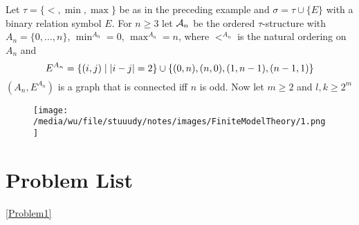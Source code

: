 \documentclass[11pt]{article}
\begin{document}
\begin{examplle}[]
Let \(\tau=\{<,\min,\max\}\) be as in the preceding example and \(\sigma=\tau\cup\{E\}\) with a
binary relation symbol \(E\). For \(n\ge3\) let \(\mathcal{A}_n\) be the ordered \(\tau\)-structure
with \(A_n=\{0,\dots,n\}\), \(\min^{A_n}=0\), \(\max^{A_n}=n\), where \(<^{A_n}\) is the natural
ordering on \(A_n\) and
\begin{equation*}
E^{A_n}=\{(i,j)\mid\abs{i-j}=2\}\cup
\{(0,n),(n,0),(1,n-1),(n-1,1)\}
\end{equation*}
\((A_n,E^{A_n})\) is a graph that is connected iff \(n\) is odd. Now let \(m\ge2\) and
\(l,k\ge2^m\)

\begin{figure}[htbp]
\centering
\texttt{[image: /media/wu/file/stuuudy/notes/images/FiniteModelTheory/1.png]}
\end{figure}
\end{examplle}



\section{Problem List}
\label{sec:org1760486}
\ref{Problem1}
\end{document}

